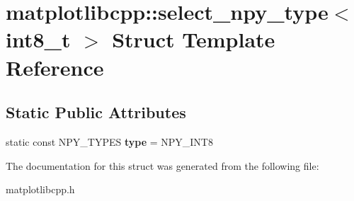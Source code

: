 \hypertarget{structmatplotlibcpp_1_1select__npy__type_3_01int8__t_01_4}{}\section{matplotlibcpp\+:\+:select\+\_\+npy\+\_\+type$<$ int8\+\_\+t $>$ Struct Template Reference}
\label{structmatplotlibcpp_1_1select__npy__type_3_01int8__t_01_4}
\subsection*{Static Public Attributes}
\begin{DoxyCompactItemize}
\item 
\mbox{\label{structmatplotlibcpp_1_1select__npy__type_3_01int8__t_01_4_a74836a19458ed32ca8948a4337364eae}} 
static const N\+P\+Y\+\_\+\+T\+Y\+P\+ES {\bfseries type} = N\+P\+Y\+\_\+\+I\+N\+T8
\end{DoxyCompactItemize}


The documentation for this struct was generated from the following file\+:\begin{DoxyCompactItemize}
\item 
matplotlibcpp.\+h\end{DoxyCompactItemize}
